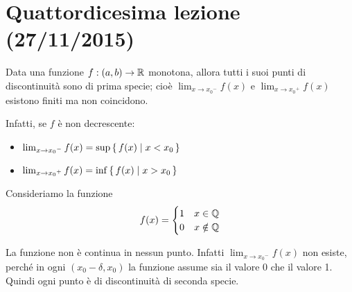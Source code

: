 \chapter{Quattordicesima lezione (27/11/2015)}

\begin{remark}
Data una funzione $f: (a, b) \to \mathbb R$ monotona, allora tutti i suoi punti di discontinuità sono di prima specie; cioè $\lim_{x \to {x_0}^-} f(x)$ e $\lim_{x \to {x_0}^+} f(x)$ esistono finiti ma non coincidono.
\end{remark}
Infatti, se $f$ è non decrescente:
\begin{itemize}
\item $\lim_{x \to {x_0}^-} f(x) = \sup \set{f(x) | x < x_0}$
\item $\lim_{x \to {x_0}^+} f(x) = \inf \set{f(x) | x > x_0}$
\end{itemize}
\begin{center}
\end{center}

\begin{example}
Consideriamo la funzione
\begin{equation*}
f(x) = \begin{cases}
1 & x \in \mathbb Q \\
0 & x \notin \mathbb Q
\end{cases}
\end{equation*}
\begin{center}
\end{center}
La funzione non è continua in nessun punto. Infatti $\lim_{x \to {x_0}^-} f(x)$ non esiste, perché in ogni $(x_0 - \delta, x_0)$ la funzione assume sia il valore 0 che il valore 1. Quindi ogni punto è di discontinuità di seconda specie.
\end{example}

